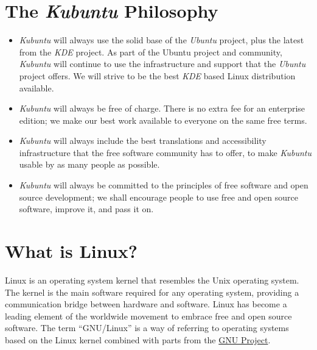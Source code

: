 \documentclass[letterpaper,10pt,english]{sphinxmanual}
\begin{document}
\section{The \emph{Kubuntu} Philosophy}
\label{welcome:the-kubuntu-philosophy}\begin{itemize}
\item {} 
\emph{Kubuntu} will always use the solid base of the \emph{Ubuntu} project, plus the latest from the \emph{KDE} project. As part of the Ubuntu project and community, \emph{Kubuntu} will continue to use the infrastructure and support that the \emph{Ubuntu} project offers. We will strive to be the best \emph{KDE} based Linux distribution available.

\item {} 
\emph{Kubuntu} will always be free of charge. There is no extra fee for an enterprise edition; we make our best work available to everyone on the same free terms.

\item {} 
\emph{Kubuntu} will always include the best translations and accessibility infrastructure that the free software community has to offer, to make \emph{Kubuntu} usable by as many people as possible.

\item {} 
\emph{Kubuntu} will always be committed to the principles of free software and open source development; we shall encourage people to use free and open source software, improve it, and pass it on.

\end{itemize}


\section{What is Linux?}
\label{welcome:what-is-linux}
Linux is an operating system kernel that resembles the Unix operating system. The kernel is the main software required for any operating system, providing a communication bridge between hardware and software. Linux has become a leading element of the worldwide movement to embrace free and open source software. The term ``GNU/Linux'' is a way of referring to operating systems based on the Linux kernel combined with parts from the \href{http://www.gnu.org}{GNU Project}.
\end{document}
